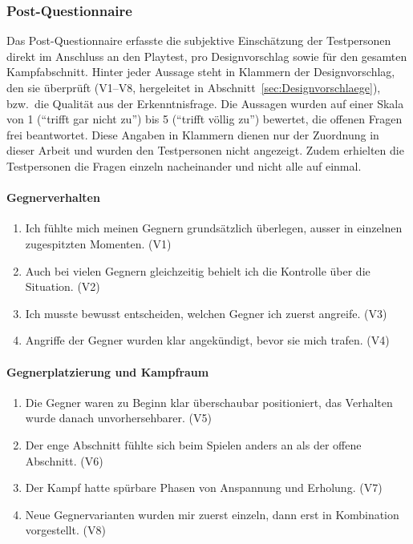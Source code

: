 \documentclass[../Main.tex]{subfiles}
\begin{document}
\subsubsection{Post-Questionnaire} \label{sec:PostQuestionnaire}

Das Post-Questionnaire erfasste die subjektive Einschätzung der Testpersonen direkt im Anschluss an den Playtest, pro Designvorschlag sowie für den gesamten Kampfabschnitt. Hinter jeder Aussage steht in Klammern der Designvorschlag, den sie überprüft (V1--V8, hergeleitet in Abschnitt~\ref{sec:Designvorschlaege}), bzw.\ die Qualität aus der Erkenntnisfrage. Die Aussagen wurden auf einer Skala von 1 (\enquote{trifft gar nicht zu}) bis 5 (\enquote{trifft völlig zu}) bewertet, die offenen Fragen frei beantwortet. Diese Angaben in Klammern dienen nur der Zuordnung in dieser Arbeit und wurden den Testpersonen nicht angezeigt. Zudem erhielten die Testpersonen die Fragen einzeln nacheinander und nicht alle auf einmal.

\paragraph{Gegnerverhalten}
\begin{enumerate}[label=\textbf{Q\arabic*}, leftmargin=1.5cm, itemsep=0.5em]
    \item Ich fühlte mich meinen Gegnern grundsätzlich überlegen, ausser in einzelnen zugespitzten Momenten. \hfill (V1)
    \item Auch bei vielen Gegnern gleichzeitig behielt ich die Kontrolle über die Situation. \hfill (V2)
    \item Ich musste bewusst entscheiden, welchen Gegner ich zuerst angreife. \hfill (V3)
    \item Angriffe der Gegner wurden klar angekündigt, bevor sie mich trafen. \hfill (V4)
\end{enumerate}

\paragraph{Gegnerplatzierung und Kampfraum}
\begin{enumerate}[label=\textbf{Q\arabic*}, leftmargin=1.5cm, itemsep=0.5em, resume]
    \item Die Gegner waren zu Beginn klar überschaubar positioniert, das Verhalten wurde danach unvorhersehbarer. \hfill (V5)
    \item Der enge Abschnitt fühlte sich beim Spielen anders an als der offene Abschnitt. \hfill (V6)
    \item Der Kampf hatte spürbare Phasen von Anspannung und Erholung. \hfill (V7)
    \item Neue Gegnervarianten wurden mir zuerst einzeln, dann erst in Kombination vorgestellt. \hfill (V8)
\end{enumerate}
\end{document}
